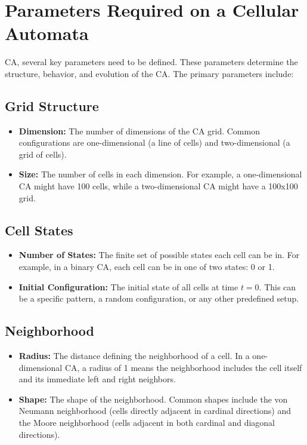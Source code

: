 \documentclass[9pt,a4paper,twoside]{tau-class/tau}
\begin{document}
\section{Parameters Required on a Cellular Automata}

CA, several key parameters need to be defined. These parameters determine the structure, behavior, and evolution of the CA. The primary parameters include:

\subsection{Grid Structure}

\begin{itemize}
    \item \textbf{Dimension:} The number of dimensions of the CA grid. Common configurations are one-dimensional (a line of cells) and two-dimensional (a grid of cells).
    \item \textbf{Size:} The number of cells in each dimension. For example, a one-dimensional CA might have 100 cells, while a two-dimensional CA might have a 100x100 grid.
\end{itemize}

\subsection{Cell States}

\begin{itemize}
    \item \textbf{Number of States:} The finite set of possible states each cell can be in. For example, in a binary CA, each cell can be in one of two states: 0 or 1.
    \item \textbf{Initial Configuration:} The initial state of all cells at time \( t = 0 \). This can be a specific pattern, a random configuration, or any other predefined setup.
\end{itemize}

\subsection{Neighborhood}

\begin{itemize}
    \item \textbf{Radius:} The distance defining the neighborhood of a cell. In a one-dimensional CA, a radius of 1 means the neighborhood includes the cell itself and its immediate left and right neighbors.
    \item \textbf{Shape:} The shape of the neighborhood. Common shapes include the von Neumann neighborhood (cells directly adjacent in cardinal directions) and the Moore neighborhood (cells adjacent in both cardinal and diagonal directions).
\end{itemize}
\end{document}
